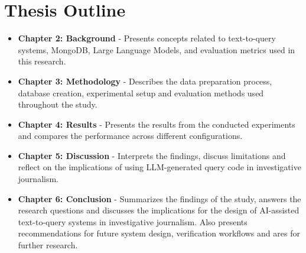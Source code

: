 \section{Thesis Outline}

\begin{itemize}
    \item \textbf{Chapter 2: Background} - Presents concepts related to text-to-query systems, MongoDB, Large Language Models, and evaluation metrics used in this research.
    \item \textbf{Chapter 3: Methodology} - Describes the data preparation process, database creation, experimental setup and evaluation methods used throughout the study. 
   \item \textbf{Chapter 4: Results} - Presents the results from the conducted experiments and compares the performance across different configurations. 
    \item \textbf{Chapter 5: Discussion} - Interprets the findings, discuss limitations and reflect on the implications of using LLM-generated query code in investigative journalism. 
   \item \textbf{Chapter 6: Conclusion} - Summarizes the findings of the study, answers the research questions and discusses the implications for the design of AI-assisted text-to-query systems in investigative journalism. Also presents recommendations for future system design, verification workflows and ares for further research. 
\end{itemize}

